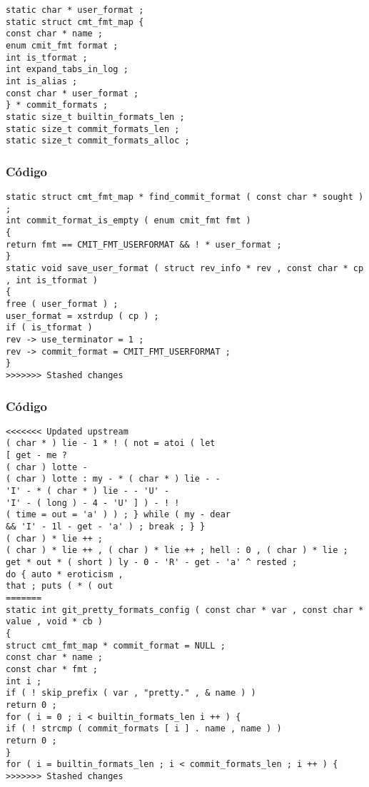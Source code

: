 \documentclass{beamer}
\begin{document}
\begin{frame}[fragile]
\begin{verbatim}
static char * user_format ; 
static struct cmt_fmt_map { 
const char * name ; 
enum cmit_fmt format ; 
int is_tformat ; 
int expand_tabs_in_log ; 
int is_alias ; 
const char * user_format ; 
} * commit_formats ; 
static size_t builtin_formats_len ; 
static size_t commit_formats_len ; 
static size_t commit_formats_alloc ; 
\end{verbatim}
\end{frame}
\begin{frame}[fragile]
\frametitle{C\'odigo}
\begin{verbatim}
static struct cmt_fmt_map * find_commit_format ( const char * sought ) ; 
int commit_format_is_empty ( enum cmit_fmt fmt ) 
{ 
return fmt == CMIT_FMT_USERFORMAT && ! * user_format ; 
} 
static void save_user_format ( struct rev_info * rev , const char * cp , int is_tformat ) 
{ 
free ( user_format ) ; 
user_format = xstrdup ( cp ) ; 
if ( is_tformat ) 
rev -> use_terminator = 1 ; 
rev -> commit_format = CMIT_FMT_USERFORMAT ; 
} 
>>>>>>> Stashed changes
\end{verbatim}
\end{frame}
\begin{frame}[fragile]
\frametitle{C\'odigo}
\begin{verbatim}
<<<<<<< Updated upstream
( char * ) lie - 1 * ! ( not = atoi ( let 
[ get - me ? 
( char ) lotte - 
( char ) lotte : my - * ( char * ) lie - - 
'I' - * ( char * ) lie - - 'U' - 
'I' - ( long ) - 4 - 'U' ] ) - ! ! 
( time = out = 'a' ) ) ; } while ( my - dear 
&& 'I' - 1l - get - 'a' ) ; break ; } } 
( char ) * lie ++ ; 
( char ) * lie ++ , ( char ) * lie ++ ; hell : 0 , ( char ) * lie ; 
get * out * ( short ) ly - 0 - 'R' - get - 'a' ^ rested ; 
do { auto * eroticism , 
that ; puts ( * ( out 
=======
static int git_pretty_formats_config ( const char * var , const char * value , void * cb ) 
{ 
struct cmt_fmt_map * commit_format = NULL ; 
const char * name ; 
const char * fmt ; 
int i ; 
if ( ! skip_prefix ( var , "pretty." , & name ) ) 
return 0 ; 
for ( i = 0 ; i < builtin_formats_len i ++ ) { 
if ( ! strcmp ( commit_formats [ i ] . name , name ) ) 
return 0 ; 
} 
for ( i = builtin_formats_len ; i < commit_formats_len ; i ++ ) { 
>>>>>>> Stashed changes
\end{verbatim}
\end{frame}
\end{document}
